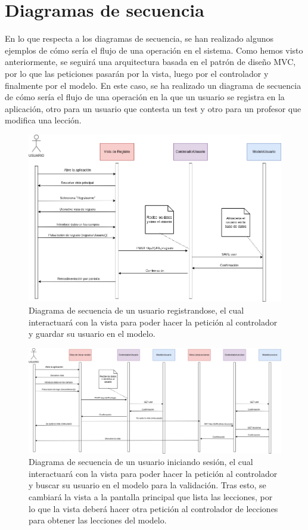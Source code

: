 \section{Diagramas de secuencia}
En lo que respecta a los diagramas de secuencia, se han realizado algunos ejemplos de cómo sería el flujo de una operación en el sistema. Como hemos visto anteriormente,
se seguirá una arquitectura basada en el patrón de diseño MVC, por lo que las peticiones pasarán por la vista, luego por el controlador y finalmente por el modelo.
En este caso, se ha realizado un diagrama de secuencia de cómo sería el flujo de una operación en la que un usuario se registra en la aplicación, otro para un usuario que contesta un test y otro
para un profesor que modifica una lección.

\begin{figure}[H]
    \centering
    \centerline{\includegraphics[width=\textwidth]{imagenes/c6/diagramadesecuencia.png}}
    \caption{Diagrama de secuencia de un usuario registrandose, el cual interactuará con la vista para poder hacer la petición al controlador y guardar su usuario en el modelo.}
    \label{fig:diagramadesecuencia}    
\end{figure}

\begin{figure}[H]
    \centering
    \centerline{\includegraphics[width=\textwidth]{imagenes/c6/diagramadesecuencia2.png}}
    \caption{Diagrama de secuencia de un usuario iniciando sesión, el cual interactuará con la vista para poder hacer la petición al controlador y buscar su usuario en el modelo para la validación. Tras esto, se cambiará la vista a la pantalla principal que lista las lecciones, por lo que la vista deberá hacer otra petición al controlador de lecciones para obtener las lecciones del modelo.}
    \label{fig:diagramadesecuencia2}    
\end{figure}

